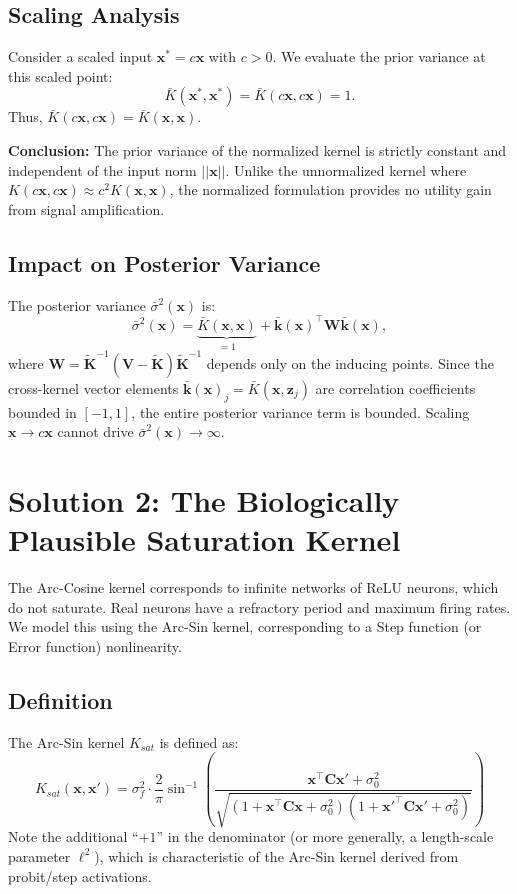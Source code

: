\documentclass[11pt]{article}
\newcommand{\bx}{\mathbf{x}}
\newcommand{\bz}{\mathbf{z}}
\newcommand{\bk}{\mathbf{k}}
\newcommand{\bK}{\mathbf{K}}
\newcommand{\bC}{\mathbf{C}}
\newcommand{\bV}{\mathbf{V}}
\begin{document}
\subsection{Scaling Analysis}
Consider a scaled input $\bx^* = c \bx$ with $c > 0$. We evaluate the prior variance at this scaled point:
\begin{equation}
    \bar{K}(\bx^*, \bx^*) = \bar{K}(c\bx, c\bx) = 1.
\end{equation}
Thus, $\bar{K}(c\bx, c\bx) = \bar{K}(\bx, \bx)$.

\textbf{Conclusion:} The prior variance of the normalized kernel is strictly constant and independent of the input norm $||\bx||$. Unlike the unnormalized kernel where $K(c\bx, c\bx) \approx c^2 K(\bx, \bx)$, the normalized formulation provides no utility gain from signal amplification.

\subsection{Impact on Posterior Variance}
The posterior variance $\bar{\sigma}^2(\bx)$ is:
\begin{equation}
    \bar{\sigma}^2(\bx) = \underbrace{\bar{K}(\bx, \bx)}_{=1} + \bar{\bk}(\bx)^\top \mathbf{W} \bar{\bk}(\bx),
\end{equation}
where $\mathbf{W} = \tilde{\bK}^{-1} (\bV - \tilde{\bK}) \tilde{\bK}^{-1}$ depends only on the inducing points.
Since the cross-kernel vector elements $\bar{\bk}(\bx)_j = \bar{K}(\bx, \bz_j)$ are correlation coefficients bounded in $[-1, 1]$, the entire posterior variance term is bounded. Scaling $\bx \to c\bx$ cannot drive $\bar{\sigma}^2(\bx) \to \infty$.
\section{Solution 2: The Biologically Plausible Saturation Kernel}

The Arc-Cosine kernel corresponds to infinite networks of ReLU neurons, which do not saturate. Real neurons have a refractory period and maximum firing rates. We model this using the Arc-Sin kernel, corresponding to a Step function (or Error function) nonlinearity.

\subsection{Definition}
The Arc-Sin kernel $K_{sat}$ is defined as:
\begin{equation}
    K_{sat}(\bx, \bx') = \sigma_f^2 \cdot \frac{2}{\pi} \sin^{-1}\left( \frac{\bx^\top \bC \bx' + \sigma_0^2}{\sqrt{(1 + \bx^\top \bC \bx + \sigma_0^2)(1 + \bx'^\top \bC \bx' + \sigma_0^2)}} \right)
\end{equation}
Note the additional ``$+1$'' in the denominator (or more generally, a length-scale parameter $\ell^2$), which is characteristic of the Arc-Sin kernel derived from probit/step activations.
\end{document}
